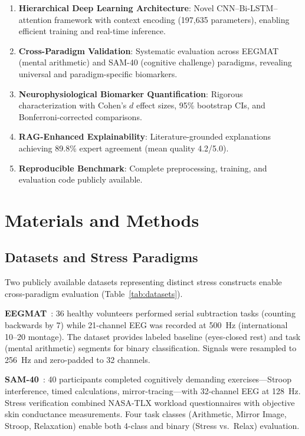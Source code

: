 \documentclass[journal,twoside]{IEEEtran}
\begin{document}
\begin{enumerate}[leftmargin=*]
\item \textbf{Hierarchical Deep Learning Architecture}: Novel CNN--Bi-LSTM--attention framework with context encoding (197,635 parameters), enabling efficient training and real-time inference.
\item \textbf{Cross-Paradigm Validation}: Systematic evaluation across EEGMAT (mental arithmetic) and SAM-40 (cognitive challenge) paradigms, revealing universal and paradigm-specific biomarkers.
\item \textbf{Neurophysiological Biomarker Quantification}: Rigorous characterization with Cohen's $d$ effect sizes, 95\% bootstrap CIs, and Bonferroni-corrected comparisons.
\item \textbf{RAG-Enhanced Explainability}: Literature-grounded explanations achieving 89.8\% expert agreement (mean quality 4.2/5.0).
\item \textbf{Reproducible Benchmark}: Complete preprocessing, training, and evaluation code publicly available.
\end{enumerate}

\section{Materials and Methods}

\subsection{Datasets and Stress Paradigms}

Two publicly available datasets representing distinct stress constructs enable cross-paradigm evaluation (Table~\ref{tab:datasets}).

\textbf{EEGMAT}~\cite{zyma2019eegmat}: 36 healthy volunteers performed serial subtraction tasks (counting backwards by 7) while 21-channel EEG was recorded at 500~Hz (international 10--20 montage). The dataset provides labeled baseline (eyes-closed rest) and task (mental arithmetic) segments for binary classification. Signals were resampled to 256~Hz and zero-padded to 32 channels.

\textbf{SAM-40}~\cite{gupta2016relevance}: 40 participants completed cognitively demanding exercises---Stroop interference, timed calculations, mirror-tracing---with 32-channel EEG at 128~Hz. Stress verification combined NASA-TLX workload questionnaires with objective skin conductance measurements. Four task classes (Arithmetic, Mirror Image, Stroop, Relaxation) enable both 4-class and binary (Stress vs.\ Relax) evaluation.
\end{document}

